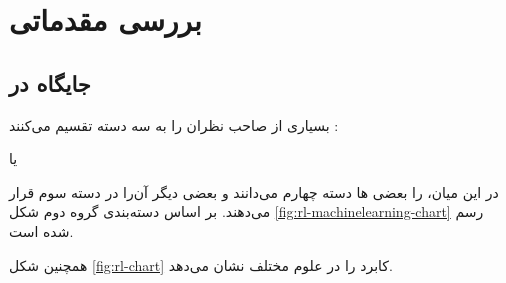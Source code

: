 \section{بررسی مقدماتی }

\subsection{جایگاه  در }
بسیاری از صاحب نظران  را به سه دسته تقسیم می‌کنند :
\begin{enuminline}
	\item {}
	\item {} یا 
	\item {}
\end{enuminline}

در این میان،
را بعضی ها دسته چهارم می‌دانند و  بعضی دیگر آن‌را در دسته سوم قرار می‌دهند. بر اساس دسته‌بندی گروه دوم شکل 
\ref{fig:rl-machinelearning-chart}
رسم شده است.


همچنین شکل 
\ref{fig:rl-chart}
کابرد  را در علوم مختلف نشان می‌دهد.

